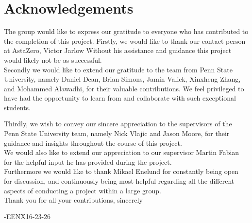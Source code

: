 \thispagestyle{plain}			%
\section*{Acknowledgements}
The group would like to express our gratitude to everyone who has contributed to the completion of this project. Firstly, we would like to thank our contact person at AstaZero, Victor Jarlow Without his assistance and guidance this project would likely not be as successful. \\

Secondly we would like to extend our gratitude to the team from Penn State University, namely Daniel Dean, Brian Simons, Jamin Valick, Xinxheng Zhang, and Mohammed Alawadhi, for their valuable contributions. We feel privileged to have had the opportunity to learn from and collaborate with such exceptional students.

Thirdly, we wish to convey our sincere appreciation to the supervisors of the Penn State University team, namely Nick Vlajic and Jason Moore, for their guidance and insights throughout the course of this project.
\\

We would also like to extend our appreciation to our supervisor Martin Fabian for the helpful input he has provided during the project. 
\\

Furthermore we would like to thank Mikael Enelund for constantly being open for discussion, and continuously being most helpful regarding all the different aspects of conducting a project within a large group. 
\\

Thank you for all your contributions, sincerely

\vspace{1.5cm}
\hfill
-EENX16-23-26


